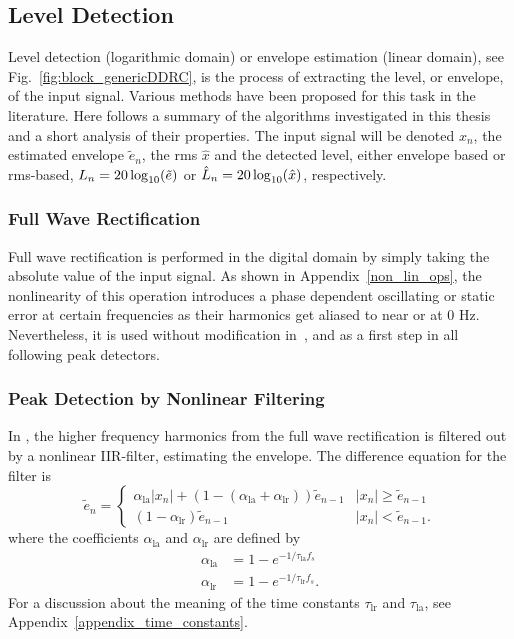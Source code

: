 \documentclass[../main2.tex]{subfiles}
\begin{document}
\subsection{Level Detection}\label{level_detection}
Level detection (logarithmic domain) or envelope estimation (linear domain), see Fig.~\ref{fig:block_genericDDRC}, is the process of extracting the level, or envelope, of the input signal. Various methods have been proposed for this task in the literature. Here follows a summary of the algorithms investigated in this thesis and a short analysis of their properties. The input signal will be denoted $x_n$, the estimated envelope $\tilde{e}_n$, the rms $\hat{x}$ and the detected level, either envelope based or rms-based, $L_n = 20\log_{10}(\tilde{e})$ or $\hat{L}_n=20\log_{10}(\hat{x})$, respectively. 

\subsubsection{Full Wave Rectification}\label{full_wave_rect}
Full wave rectification is performed in the digital domain by simply taking the absolute value of the input signal. As shown in Appendix~\ref{non_lin_ops}, the nonlinearity of this operation introduces a phase dependent oscillating or static error at certain frequencies as their harmonics get aliased to near or at 0 Hz. Nevertheless, it is used without modification in~\cite{reiss2012tutorial}, and as a first step in all following peak detectors.

\subsubsection{Peak Detection by Nonlinear Filtering}\label{peak_detection}
In \cite{mcnally1984dynamic, zolzer1997digital}, the higher frequency harmonics from the full wave rectification is filtered out by a nonlinear IIR-filter, estimating the envelope. The difference equation for the filter is
\begin{equation}\label{eq:analog_det}
\tilde{e}_n = \begin{cases}
    \alpha_\text{la} |x_n| + (1- (\alpha_\text{la} + \alpha_\text{lr})) \tilde{e}_{n-1}  	& |x_n| \geq \tilde{e}_{n-1} \\
    (1-\alpha_\text{lr}) \tilde{e}_{n-1} 							& |x_n| < \tilde{e}_{n-1}.
\end{cases}
\end{equation}
where the coefficients $\alpha_\text{la}$ and $\alpha_\text{lr}$ are defined by
\begin{align}
\alpha_\text{la} &= 1 - e^{-1/\tau_\text{la} f_s } \label{eq:attack_coeff_def}\\
\alpha_\text{lr} &= 1 - e^{-1/\tau_\text{lr} f_s } \label{eq:release_coeff_def}.
\end{align}
For a discussion about the meaning of the time constants $\tau_\text{lr}$ and $\tau_\text{la}$, see Appendix~\ref{appendix_time_constants}.
\end{document}
